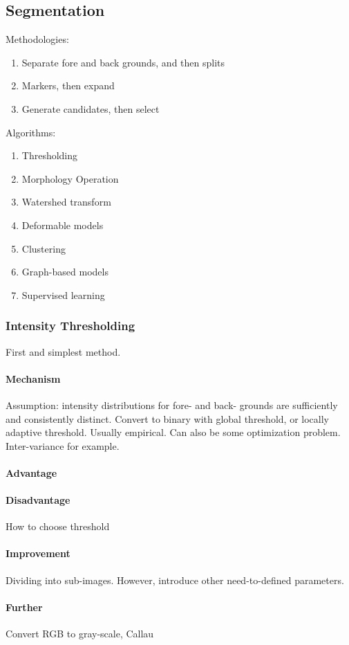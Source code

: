 \documentclass[10pt,a4paper]{article}
\begin{document}
\subsection{Segmentation}
Methodologies:
\begin{enumerate}
	\item Separate fore and back grounds, and then splits
	\item Markers, then expand
	\item Generate candidates, then select
\end{enumerate}
Algorithms:
\begin{enumerate}
	\item Thresholding
	\item Morphology Operation
	\item Watershed transform
	\item Deformable models
	\item Clustering
	\item Graph-based models
	\item Supervised learning
\end{enumerate}

\subsubsection{Intensity Thresholding}
First and simplest method.
\paragraph{Mechanism}
Assumption: intensity distributions for fore- and back- grounds are sufficiently and consistently distinct. Convert to binary with global threshold, or locally adaptive threshold. Usually empirical. Can also be some optimization problem. Inter-variance for example. 
\paragraph{Advantage}
\paragraph{Disadvantage}
How to choose threshold
\paragraph{Improvement}
Dividing into sub-images. However, introduce other need-to-defined parameters.
\paragraph{Further}
Convert RGB to gray-scale, Callau
\end{document}
